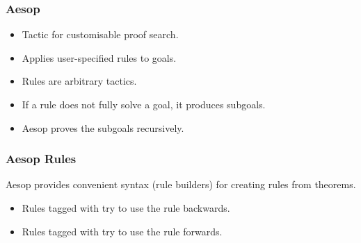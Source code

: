 \begin{frame}
  \frametitle{Aesop}

  \begin{itemize}
    \item Tactic for customisable proof search.
    \item Applies user-specified rules to goals.
    \item Rules are arbitrary tactics.
    \item If a rule does not fully solve a goal, it produces subgoals.
    \item Aesop proves the subgoals recursively.
  \end{itemize}
\end{frame}

%


%

\begin{frame}
  \frametitle{Aesop Rules}

  Aesop provides convenient syntax (rule builders) for
  creating rules from theorems.

  \pause

  \begin{itemize}
    \item Rules tagged with  try to use the rule backwards.
    \item Rules tagged with  try to use the rule forwards.
  \end{itemize}
\end{frame}

%

